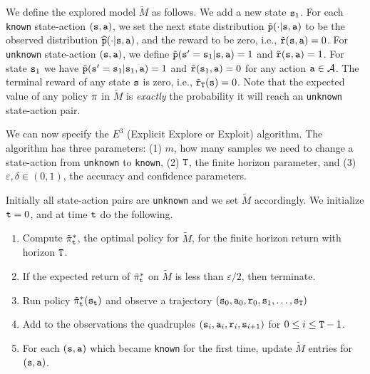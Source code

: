 We define the explored model $\widetilde{M}$ as follows. We add a new
state ${\tt s}_1$. For each \texttt{known} state-action $({\tt s},{\tt a})$, we set the next
state distribution $\tilde{{\tt p}}(\cdot|{\tt s},{\tt a})$ to be the
observed distribution $\widehat{{\tt p}}(\cdot|{\tt s},{\tt a})$, and the
reward to be zero, i.e., $\tilde{{\tt r}}({\tt s},{\tt a})=0$.
%
For \texttt{unknown} state-action $({\tt s},{\tt a})$, we define
$\tilde{{\tt p}}({\tt s}'={\tt s}_1 | {\tt s},{\tt a})=1$ and
$\tilde{{\tt r}}({\tt s},{\tt a})=1$. For state ${\tt s}_1$ we
have $\tilde{{\tt p}}({\tt s}'={\tt s}_1 | {\tt s}_1,{\tt a})=1$ and
$\tilde{{\tt r}}({\tt s}_1,{\tt a})=0$ for any action
${\tt a}\in\mathcal{A}$.
The terminal reward of any state ${\tt s}$ is zero, i.e., $\tilde{{\tt r}}_{\tt T}({\tt s})=0$.
%
Note that the expected value of any policy $\pi$ in $\widetilde{M}$
is {\em exactly} the probability it will reach an \texttt{unknown}
state-action pair.

We can now specify the $E^3$ (Explicit Explore or Exploit)
algorithm. The algorithm has three parameters: (1) $m$, how many
samples we need to change a state-action from \texttt{unknown} to \texttt{known}, (2)
${\tt T}$, the finite horizon parameter, and (3) $\varepsilon,\delta\in(0,1)$, the
accuracy and confidence parameters.

Initially all state-action pairs are \texttt{unknown} and we set $\widetilde{M}$
accordingly. We initialize ${\tt t}=0$, and at time ${\tt t}$ do the
following.
\begin{enumerate}
\item
Compute $\tilde{\pi}^*_{\tt t}$, the optimal policy for
$\widetilde{M}$, for the finite horizon return with horizon ${\tt T}$.
\item
If the expected return of $\tilde{\pi}^*_{\tt t}$ on $\widetilde{M}$
is less than $\varepsilon/2$, then terminate.
\item
Run policy $\tilde{\pi}^*_{\tt t}({\tt s}_{{\tt t}})$ and observe a trajectory $({\tt s}_0,{\tt a}_0,{\tt r}_0,{\tt s}_1, \ldots, {\tt s}_{\tt T})$
\item
Add to the observations the quadruples
$({\tt s}_i,{\tt a}_i,{\tt r}_i,{\tt s}_{i+1})$
for $0\leq i\leq {\tt T}-1$.
\item
For each $({\tt s},{\tt a})$ which became \texttt{known} for the first time,
update $\widetilde{M}$ entries for $({\tt s},{\tt a})$.
\end{enumerate}


